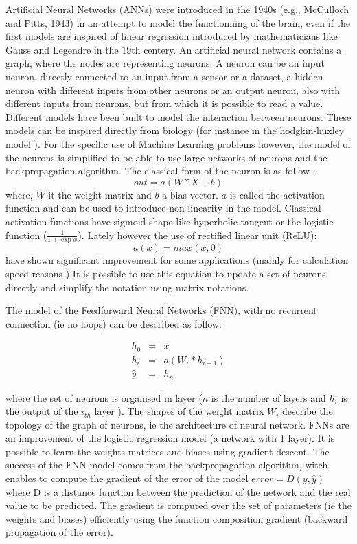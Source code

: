 Artificial Neural Networks (ANNs) were introduced in the 1940s (e.g., McCulloch and Pitts, 1943) in an attempt to model the functionning of the brain, even if the first models are inspired of linear regression introduced by mathematicians like Gauss and Legendre in the 19th centery. An artificial neural network contains a graph, where the nodes are representing neurons. A neuron can be an input neuron, directly connected to an input from a sensor or a dataset, a hidden neuron with different inputs from other neurons or an output neuron, also with different inputs from neurons, but from which it is possible to read a value. Different models have been built to model the interaction between neurons. These models can be inspired directly from biology (for instance in the hodgkin-huxley model \cite{lytton2002hodgkin}). For the specific use of Machine Learning problems however, the model of the neurons is simplified to be able to use large networks of neurons and the backpropagation algorithm. The classical form of the neuron is as follow : 
$$ out = a (W * X + b)$$ where, $W$ it the weight matrix and $b$ a bias vector. $a$ is called the activation function and can be used to introduce non-linearity in the model.
Classical activation functions have sigmoid shape like hyperbolic tangent or the logistic function ($ \frac 1 {1 + \exp x}$).
Lately however the use of rectified linear unit (ReLU): $$a(x) = max(x, 0)$$ have shown significant improvement for some applications (mainly for calculation speed reasons \cite{dahl2013improving})  
It is possible to use this equation to update a set of neurons directly and simplify the notation using matrix notations. 

The model of the Feedforward Neural Networks (FNN), with no recurrent connection (ie no loops) can be described as follow:

$$
\begin{array}{rcr} 
    h_0 & = & x \\h_i & = & a ( W_{i} * h_{i-1}) \\ \hat{y} & = & h_n
\end{array}
$$

where the set of neurons is organised in layer ($n$ is the number of layers and $h_i$ is the output of the $i_{th}$ layer ). The shapes of the weight matrix $W_i$ describe the topology of the graph of neurons, ie the architecture of neural network. FNNs are an improvement of the logistic regression model (a network with 1 layer). It is possible to learn the weights matrices and biases using gradient descent. The success of the FNN model comes from the backpropagation algorithm, witch enables to compute the gradient of the error of the model  $error = D(y, \hat{y})$ where D is a distance function between the prediction of the network and the real value to be predicted. The gradient is computed over the set of parameters (ie the weights and biases) efficiently using the function composition gradient (backward propagation of the error).

